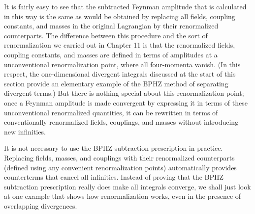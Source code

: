It is fairly easy to see that the subtracted Feynman amplitude that is
calculated in this way is the same as would be obtained by replacing all
fields, coupling constants, and masses in the original Lagrangian by their
renormalized counterparts. The difference between this procedure and the
sort of renormalization we carried out in Chapter 11 is that the renormalized
fields, coupling constants, and masses are defined in terms of amplitudes at
a unconventional renormalization point, where all four-momenta vanish. (In
this respect, the one-dimensional divergent integrals discussed at the start
of this section provide an elementary example of the BPHZ method of
separating divergent terms.) But there is nothing special about this
renormalization point; once a Feynman amplitude is made convergent by
expressing it in terms of these unconventional renormalized quantities, it
can be rewritten in terms of conventionally renormalized fields, couplings,
and masses without introducing new infinities.

It is not necessary to use the BPHZ subtraction prescription in practice.
Replacing fields, masses, and couplings with their renormalized counterparts
(defined using any convenient renormalization points) automatically provides
counterterms that cancel all infinities. Instead of proving that the BPHZ
subtraction prescription really does make all integrals converge, we shall
just look at one example that shows how renormalization works, even in the
presence of overlapping divergences.

